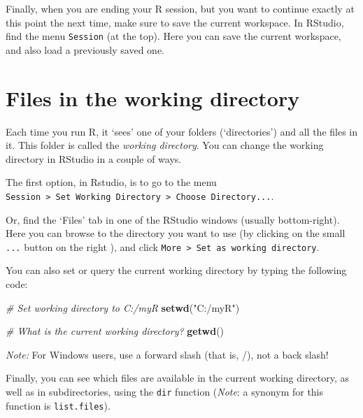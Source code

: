 \documentclass[]{book}
\newenvironment{Shaded}{\begin{snugshade}}{\end{snugshade}}
\newcommand{\CommentTok}[1]{\textcolor[rgb]{0.56,0.35,0.01}{\textit{#1}}}
\newcommand{\KeywordTok}[1]{\textcolor[rgb]{0.13,0.29,0.53}{\textbf{#1}}}
\newcommand{\NormalTok}[1]{#1}
\newcommand{\StringTok}[1]{\textcolor[rgb]{0.31,0.60,0.02}{#1}}
\begin{document}
Finally, when you are ending your R session, but you want to continue exactly at this point the next time, make sure to save the current workspace. In RStudio, find the menu \texttt{Session} (at the top). Here you can save the current workspace, and also load a previously saved one.

\hypertarget{fileswd}{%
\section{Files in the working directory}\label{fileswd}}

Each time you run R, it `sees' one of your folders (`directories') and all the files in it. This folder is called the \emph{working directory}. You can change the working directory in RStudio in a couple of ways.

The first option, in Rstudio, is to go to the menu \texttt{Session\ \textgreater{}\ Set\ Working\ Directory\ \textgreater{}\ Choose\ Directory...}.

Or, find the `Files' tab in one of the RStudio windows (usually bottom-right). Here you can browse to the directory you want to use (by clicking on the small \texttt{...} button on the right ), and click \texttt{More\ \textgreater{}\ Set\ as\ working\ directory}.

You can also set or query the current working directory by typing the following code:

\begin{Shaded}
\begin{Highlighting}[]
\CommentTok{# Set working directory to C:/myR}
\KeywordTok{setwd}\NormalTok{(}\StringTok{"C:/myR"}\NormalTok{)}

\CommentTok{# What is the current working directory?}
\KeywordTok{getwd}\NormalTok{()}
\end{Highlighting}
\end{Shaded}

\emph{Note:} For Windows users, use a forward slash (that is, /), not a back slash!

Finally, you can see which files are available in the current working directory, as well as in subdirectories, using the \texttt{dir} function (\emph{Note}: a synonym for this function is \texttt{list.files}).
\end{document}
